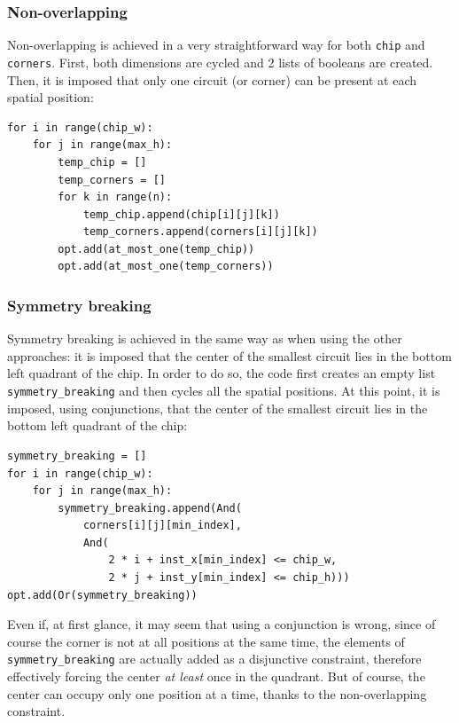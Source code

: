 \documentclass[a4paper, 12pt]{article}
\begin{document}
\subsubsection{Non-overlapping}
Non-overlapping is achieved in a very straightforward way for both \verb|chip| and \verb|corners|. First, both dimensions are cycled and 2 lists of booleans are created. Then, it is imposed that only one circuit (or corner) can be present at each spatial position:
\begin{verbatim}
for i in range(chip_w):
    for j in range(max_h):
        temp_chip = []
        temp_corners = []
        for k in range(n):
            temp_chip.append(chip[i][j][k])
            temp_corners.append(corners[i][j][k])
        opt.add(at_most_one(temp_chip))
        opt.add(at_most_one(temp_corners))
\end{verbatim}



\subsubsection{Symmetry breaking}
Symmetry breaking is achieved in the same way as when using the other approaches: it is imposed that the center of the smallest circuit lies in the bottom left quadrant of the chip. In order to do so, the code first creates an empty list \verb|symmetry_breaking| and then cycles all the spatial positions. At this point, it is imposed, using conjunctions, that the center of the smallest circuit lies in the bottom left quadrant of the chip:
\begin{verbatim}
symmetry_breaking = []
for i in range(chip_w):
    for j in range(max_h):
        symmetry_breaking.append(And(
            corners[i][j][min_index],
            And(
                2 * i + inst_x[min_index] <= chip_w,
                2 * j + inst_y[min_index] <= chip_h)))
opt.add(Or(symmetry_breaking))
\end{verbatim}

Even if, at first glance, it may seem that using a conjunction is wrong, since of course the corner is not at all positions at the same time, the elements of \verb|symmetry_breaking| are actually added as a disjunctive constraint, therefore effectively forcing the center \emph{at least} once in the quadrant. But of course, the center can occupy only one position at a time, thanks to the non-overlapping constraint.
\end{document}
